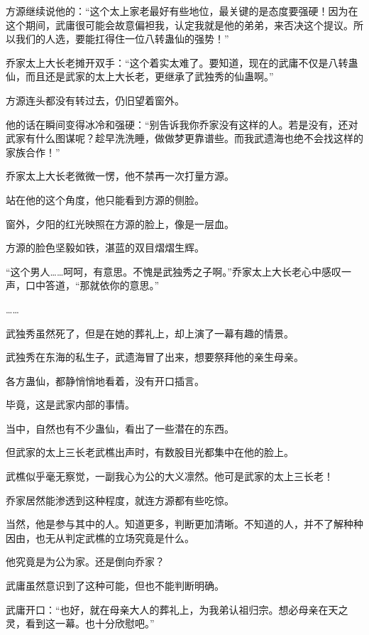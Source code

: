 
\begin{this_body}



方源继续说他的：“这个太上家老最好有些地位，最关键的是态度要强硬！因为在这个期间，武庸很可能会故意偏袒我，认定我就是他的弟弟，来否决这个提议。所以我们的人选，要能扛得住一位八转蛊仙的强势！”

乔家太上大长老摊开双手：“这个着实太难了。要知道，现在的武庸不仅是八转蛊仙，而且还是武家的太上大长老，更继承了武独秀的仙蛊啊。”

方源连头都没有转过去，仍旧望着窗外。

他的话在瞬间变得冰冷和强硬：“别告诉我你乔家没有这样的人。若是没有，还对武家有什么图谋呢？趁早洗洗睡，做做梦更靠谱些。而我武遗海也绝不会找这样的家族合作！”

乔家太上大长老微微一愣，他不禁再一次打量方源。

站在他的这个角度，他只能看到方源的侧脸。

窗外，夕阳的红光映照在方源的脸上，像是一层血。

方源的脸色坚毅如铁，湛蓝的双目熠熠生辉。

“这个男人……呵呵，有意思。不愧是武独秀之子啊。”乔家太上大长老心中感叹一声，口中答道，“那就依你的意思。”

……

武独秀虽然死了，但是在她的葬礼上，却上演了一幕有趣的情景。

武独秀在东海的私生子，武遗海冒了出来，想要祭拜他的亲生母亲。

各方蛊仙，都静悄悄地看着，没有开口插言。

毕竟，这是武家内部的事情。

当中，自然也有不少蛊仙，看出了一些潜在的东西。

但武家的太上三长老武樵出声时，有数股目光都集中在他的脸上。

武樵似乎毫无察觉，一副我心为公的大义凛然。他可是武家的太上三长老！

乔家居然能渗透到这种程度，就连方源都有些吃惊。

当然，他是参与其中的人。知道更多，判断更加清晰。不知道的人，并不了解种种因由，也无从判定武樵的立场究竟是什么。

他究竟是为公为家。还是倒向乔家？

武庸虽然意识到了这种可能，但也不能判断明确。

武庸开口：“也好，就在母亲大人的葬礼上，为我弟认祖归宗。想必母亲在天之灵，看到这一幕。也十分欣慰吧。”


\end{this_body}
